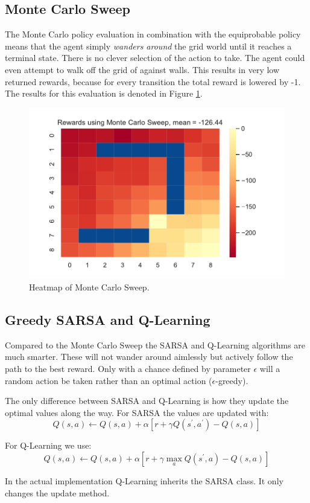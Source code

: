 \documentclass[]{scrartcl}
\begin{document}
\subsection{Monte Carlo Sweep}

The Monte Carlo policy evaluation in combination with the equiprobable policy means that the agent simply \textit{wanders around} the grid world until it reaches a terminal state. There is no clever selection of the action to take. The agent could even attempt to walk off the grid of against walls. This results in very low returned rewards, because for every transition the total reward is lowered by -1. The results for this evaluation is denoted in Figure \ref{fig:3-1}.

\begin{figure}[H]
	\centering
	\includegraphics[width=0.5\linewidth]{3-1.pdf}
	\caption{Heatmap of Monte Carlo Sweep.}
	\label{fig:3-1}
\end{figure}

\subsection{Greedy SARSA and Q-Learning}

Compared to the Monte Carlo Sweep the SARSA and Q-Learning algorithms are much smarter. These will not wander around aimlessly but actively follow the path to the best reward. Only with a chance defined by parameter $\epsilon$ will a random action be taken rather than an optimal action ($\epsilon$-greedy).

The only difference between SARSA and Q-Learning is how they update the optimal values along the way. For SARSA the values are updated with:
$$Q(s, a) \leftarrow Q(s, a)+\alpha\left[r+\gamma Q\left(s^{\prime}, a^{\prime}\right)-Q(s, a)\right]$$

For Q-Learning we use:
$$Q(s, a) \leftarrow Q(s, a)+\alpha\left[r+\gamma \max_a Q\left(s^{\prime}, a\right)-Q(s, a)\right]$$

In the actual implementation Q-Learning inherits the SARSA class. It only changes the update method.
\end{document}
